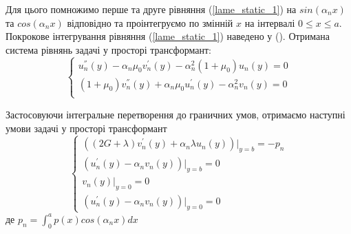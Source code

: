 Для цього помножимо перше та друге рівняння (\ref{lame_static_1}) на $sin(\alpha_n x)$ та $cos(\alpha_n x)$ відповідно та проінтегруємо по змінній $x$ на інтервалі $0 \le x \le a$.
Покрокове інтегрування рівняння (\ref{lame_static_1}) наведено у ().
Отримана система рівнянь задачі у просторі трансформант:
\begin{equation}\label{transf_static_1}
    \begin{cases}
        u_n^{''}(y) - \alpha_n \mu_0 v_n^{'}(y) - \alpha_n^2 (1 + \mu_0) u_n(y) = 0 \\
        (1 + \mu_0) v_n^{''}(y) + \alpha_n \mu_0 u_n^{'}(y)  - \alpha_n^2 v_n(y) = 0 \\
    \end{cases}
\end{equation}

Застосовуючи інтегральне перетворення до граничних умов,
отримаємо наступні умови задачі у просторі трансформант
\begin{equation}\label{transf_bound_static_1}
    \begin{cases}
        \left( (2G + \lambda)v_n^{'}(y) + \alpha_n \lambda u_n(y) \right)|_{y=b} = -p_n \\
        \left(u_n^{'}(y) - \alpha_n v_n(y)  \right)|_{y=b} = 0 \\
        v_n(y)|_{y=0} = 0 \\
        \left(u_n^{'}(y) - \alpha_n v_n(y)  \right)|_{y=0} = 0
    \end{cases}
\end{equation}
де $p_n = \int_{0}^{a} p(x) cos(\alpha_n x) dx$

